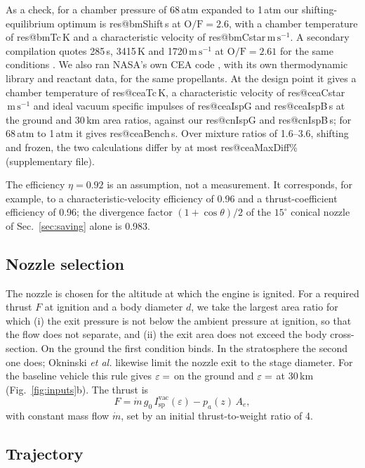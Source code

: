 \documentclass[11pt,a4paper]{article}
\makeatletter
\newcommand{\R}[1]{\csname res@#1\endcsname}
\newcommand{\Isp}{I_{\mathrm{sp}}}
\newcommand{\ms}{\,\mathrm{m\,s^{-1}}}
\makeatother
\begin{document}
As a check, for a chamber pressure of 68\,atm expanded to 1\,atm our shifting-equilibrium optimum is \R{bmShift}\,s at $\mathrm{O/F}=2.6$, with a chamber temperature of \R{bmTc}\,K and a characteristic velocity of \R{bmCstar}$\ms$. A secondary compilation quotes 285\,s, 3415\,K and 1720$\ms$ at $\mathrm{O/F}=2.61$ for the same conditions \cite{astronautix}. We also ran NASA's own CEA code \cite{cea2026}, with its own thermodynamic library and reactant data, for the same propellants. At the design point it gives a chamber temperature of \R{ceaTc}\,K, a characteristic velocity of \R{ceaCstar}$\ms$ and ideal vacuum specific impulses of \R{ceaIspG} and \R{ceaIspB}\,s at the ground and 30\,km area ratios, against our \R{cnIspG} and \R{cnIspB}\,s; for 68\,atm to 1\,atm it gives \R{ceaBench}\,s. Over mixture ratios of 1.6--3.6, shifting and frozen, the two calculations differ by at most \R{ceaMaxDiff}\% (supplementary file).

The efficiency $\eta=0.92$ is an assumption, not a measurement. It corresponds, for example, to a characteristic-velocity efficiency of 0.96 and a thrust-coefficient efficiency of 0.96; the divergence factor $(1+\cos\theta)/2$ of the $15^{\circ}$ conical nozzle of Sec.~\ref{sec:saving} alone is 0.983.

\subsection{Nozzle selection}

The nozzle is chosen for the altitude at which the engine is ignited. For a required thrust $F$ at ignition and a body diameter $d$, we take the largest area ratio for which (i) the exit pressure is not below the ambient pressure at ignition, so that the flow does not separate, and (ii) the exit area does not exceed the body cross-section. On the ground the first condition binds. In the stratosphere the second one does; Okninski \emph{et al.} \cite{okninski2016} likewise limit the nozzle exit to the stage diameter. For the baseline vehicle this rule gives $\varepsilon=\R{gndEps}$ on the ground and $\varepsilon=\R{balEps}$ at 30\,km (Fig.~\ref{fig:inputs}b). The thrust is
\begin{equation}
F=\dot m\,g_0\,\Isp^{\mathrm{vac}}(\varepsilon)-p_a(z)\,A_e ,
\end{equation}
with constant mass flow $\dot m$, set by an initial thrust-to-weight ratio of 4.

\subsection{Trajectory}
\label{sec:traj}
\end{document}
